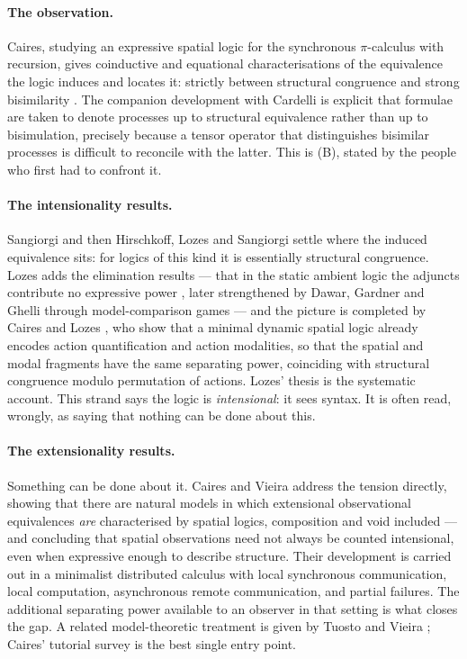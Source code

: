 \documentclass[11pt]{article}
\theoremstyle{plain}
\theoremstyle{definition}
\begin{document}
\paragraph{The observation.} Caires, studying an expressive spatial logic for the synchronous
$\pi$-calculus with recursion, gives coinductive and equational characterisations of the equivalence
the logic induces and locates it: strictly between structural congruence and strong bisimilarity
\cite{CairesObs}. The companion development with Cardelli \cite{CairesCardelliI,CairesCardelliII} is
explicit that formulae are taken to denote processes up to structural equivalence rather than up to
bisimulation, precisely because a tensor operator that distinguishes bisimilar processes is difficult
to reconcile with the latter. This is (B), stated by the people who first had to confront it.

\paragraph{The intensionality results.} Sangiorgi \cite{SangiorgiExtInt} and then Hirschkoff, Lozes and
Sangiorgi \cite{HLS02,HLS03} settle where the induced equivalence sits: for logics of this kind it is
essentially structural congruence. Lozes adds the elimination results --- that in the static ambient
logic the adjuncts contribute no expressive power \cite{LozesAdjunct}, later strengthened by Dawar,
Gardner and Ghelli through model-comparison games \cite{DGG} --- and the picture is completed by Caires
and Lozes \cite{CairesLozes}, who show that a minimal dynamic spatial logic already encodes action
quantification and action modalities, so that the spatial and modal fragments have the same separating
power, coinciding with structural congruence modulo permutation of actions. Lozes' thesis
\cite{LozesThesis} is the systematic account. This strand says the logic is \emph{intensional}: it sees
syntax. It is often read, wrongly, as saying that nothing can be done about this.

\paragraph{The extensionality results.} Something can be done about it. Caires and Vieira
\cite{CairesVieira} address the tension directly, showing that there are natural models in which
extensional observational equivalences \emph{are} characterised by spatial logics, composition and void
included --- and concluding that spatial observations need not always be counted intensional, even when
expressive enough to describe structure. Their development is carried out in a minimalist distributed
calculus with local synchronous communication, local computation, asynchronous remote communication,
and partial failures. The additional separating power available to an observer in that setting is what
closes the gap. A related model-theoretic treatment is given by Tuosto and Vieira
\cite{TuostoVieira}; Caires' tutorial survey \cite{CairesSurvey} is the best single entry point.
\end{document}
